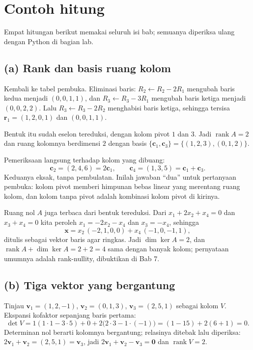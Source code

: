 
\section{Contoh hitung}

Empat hitungan berikut memakai seluruh isi bab; semuanya diperiksa ulang dengan Python di
bagian lab.

\subsection*{(a) Rank dan basis ruang kolom}

Kembali ke tabel pembuka. Eliminasi baris: $R_{2}\leftarrow R_{2}-2R_{1}$ mengubah baris
kedua menjadi $(0,0,1,1)$, dan $R_{3}\leftarrow R_{3}-3R_{1}$ mengubah baris ketiga menjadi
$(0,0,2,2)$. Lalu $R_{3}\leftarrow R_{3}-2R_{2}$ menghabisi baris ketiga, sehingga tersisa
$\mathbf{r}_{1}=(1,2,0,1)$ dan $(0,0,1,1)$.

Bentuk itu sudah eselon tereduksi, dengan kolom pivot $1$ dan $3$. Jadi
$\operatorname{rank}A=2$ dan ruang kolomnya berdimensi $2$ dengan basis
$\{\mathbf{c}_{1},\mathbf{c}_{3}\}=\{(1,2,3),(0,1,2)\}$.

Pemeriksaan langsung terhadap kolom yang dibuang:
\[
  \mathbf{c}_{2}=(2,4,6)=2\mathbf{c}_{1},
  \qquad
  \mathbf{c}_{4}=(1,3,5)=\mathbf{c}_{1}+\mathbf{c}_{3}.
\]
Keduanya eksak, tanpa pembulatan. Inilah jawaban ``dua'' untuk pertanyaan pembuka: kolom pivot
memberi himpunan bebas linear yang merentang ruang kolom, dan kolom tanpa pivot adalah
kombinasi kolom pivot di kirinya.

Ruang nol $A$ juga terbaca dari bentuk tereduksi. Dari $x_{1}+2x_{2}+x_{4}=0$ dan
$x_{3}+x_{4}=0$ kita peroleh $x_{1}=-2x_{2}-x_{4}$ dan $x_{3}=-x_{4}$, sehingga
\[
  \mathbf{x}=x_{2}\,(-2,1,0,0)+x_{4}\,(-1,0,-1,1),
\]
ditulis sebagai vektor baris agar ringkas. Jadi $\dim\ker A=2$, dan
$\operatorname{rank}A+\dim\ker A=2+2=4$ sama dengan banyak kolom; pernyataan umumnya adalah
rank-nullity, dibuktikan di Bab 7.

\subsection*{(b) Tiga vektor yang bergantung}

Tinjau $\mathbf{v}_{1}=(1,2,-1)$, $\mathbf{v}_{2}=(0,1,3)$, $\mathbf{v}_{3}=(2,5,1)$ sebagai
kolom $V$. Ekspansi kofaktor sepanjang baris pertama:
\[
  \det V=1(1\cdot1-3\cdot5)+0+2\bigl(2\cdot3-1\cdot(-1)\bigr)=(1-15)+2(6+1)=0.
\]
Determinan nol berarti kolomnya bergantung; relasinya ditebak lalu diperiksa:
$2\mathbf{v}_{1}+\mathbf{v}_{2}=(2,5,1)=\mathbf{v}_{3}$, jadi
$2\mathbf{v}_{1}+\mathbf{v}_{2}-\mathbf{v}_{3}=\mathbf{0}$ dan $\operatorname{rank}V=2$.


